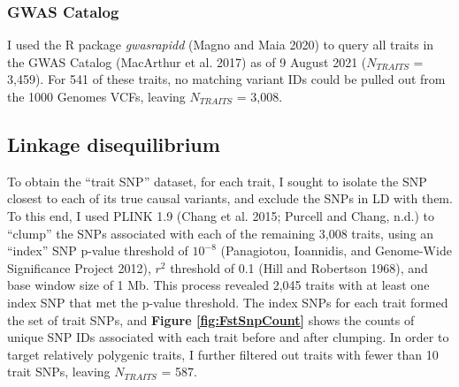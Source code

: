 \documentclass[
]{book}
\begin{document}
\hypertarget{gwas-catalog}{%
\subsubsection{GWAS Catalog}\label{gwas-catalog}}

I used the R package \emph{gwasrapidd} (Magno and Maia 2020) to query all traits in the GWAS Catalog (MacArthur et al. 2017) as of 9 August 2021 (\(N_{TRAITS}\) = 3,459). For 541 of these traits, no matching variant IDs could be pulled out from the 1000 Genomes VCFs, leaving \(N_{TRAITS}\) = 3,008.

\hypertarget{linkage-disequilibrium}{%
\subsection{Linkage disequilibrium}\label{linkage-disequilibrium}}

To obtain the ``trait SNP'' dataset, for each trait, I sought to isolate the SNP closest to each of its true causal variants, and exclude the SNPs in LD with them. To this end, I used PLINK 1.9 (Chang et al. 2015; Purcell and Chang, n.d.) to ``clump'' the SNPs associated with each of the remaining 3,008 traits, using an ``index'' SNP p-value threshold of \(10^{-8}\) (Panagiotou, Ioannidis, and Genome-Wide Significance Project 2012), \(r^2\) threshold of 0.1 (Hill and Robertson 1968), and base window size of 1 Mb. This process revealed 2,045 traits with at least one index SNP that met the p-value threshold. The index SNPs for each trait formed the set of trait SNPs, and \textbf{Figure \ref{fig:FstSnpCount}} shows the counts of unique SNP IDs associated with each trait before and after clumping. In order to target relatively polygenic traits, I further filtered out traits with fewer than 10 trait SNPs, leaving \(N_{TRAITS}\) = 587.
\end{document}
